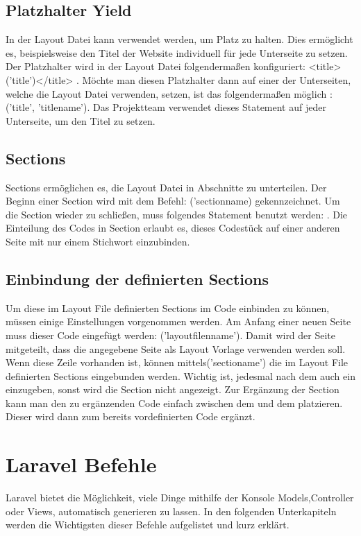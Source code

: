 \subsection{Platzhalter Yield}
In der Layout Datei kann \@yield verwendet werden, um Platz zu halten. Dies ermöglicht es, beispielsweise den Titel der Website individuell für jede Unterseite zu setzen. Der Platzhalter wird in der Layout Datei folgendermaßen konfiguriert:  <title>\@yield('title')</title> .  Möchte man diesen Platzhalter dann auf einer der Unterseiten, welche die Layout Datei verwenden, setzen, ist das folgendermaßen möglich : \@section('title', 'titlename'). Das Projektteam verwendet dieses Statement auf jeder Unterseite, um den Titel zu setzen.

\subsection{Sections}
Sections ermöglichen es, die Layout Datei in Abschnitte zu unterteilen. Der Beginn einer Section wird mit dem Befehl: \@section('sectionname) gekennzeichnet. Um die Section wieder zu schließen, muss folgendes Statement benutzt werden: \@endsection. Die Einteilung des Codes in Section erlaubt es, dieses Codestück auf einer anderen Seite mit nur einem Stichwort einzubinden. 
\subsection{Einbindung der definierten Sections}
Um diese im Layout File definierten Sections im Code einbinden zu können, müssen einige Einstellungen vorgenommen werden. Am Anfang einer neuen Seite muss dieser Code eingefügt werden: \@extends('layoutfilenname'). Damit wird der Seite mitgeteilt, dass die angegebene Seite als Layout Vorlage verwenden werden soll. Wenn diese Zeile vorhanden ist, können mittels\@section('sectioname') die im Layout File definierten Sections eingebunden werden. Wichtig ist,  jedesmal nach dem \@section auch ein \@endsection einzugeben, sonst wird die Section nicht angezeigt. Zur Ergänzung der Section kann man den zu ergänzenden Code einfach zwischen dem \@section und dem \@endsection platzieren. Dieser wird dann zum bereits vordefinierten Code ergänzt.

\section{Laravel Befehle}
Laravel bietet die Möglichkeit, viele Dinge mithilfe der Konsole Models,Controller oder Views, automatisch generieren zu lassen. In den folgenden Unterkapiteln werden die Wichtigsten dieser Befehle aufgelistet und kurz erklärt.
